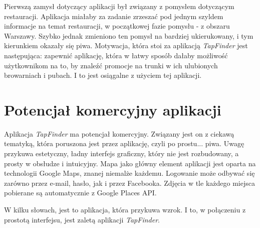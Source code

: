 \documentclass[a4paper]{article}
\begin{document}
Pierwszą zamysł dotyczący aplikacji był związany z pomysłem dotyczącym restauracji. Aplikacja miałaby za zadanie zrzeszać pod jednym szyldem informacje na temat restauracji, w początkowej fazie pomysłu - z obszaru Warszawy. Szybko jednak zmieniono ten pomysł na bardziej ukierukowany, i tym kierunkiem okazały się piwa. Motywacja, która stoi za aplikacją \textit{TapFinder} jest następująca: zapewnić aplikację, która w łatwy sposób dałaby możliwość użytkownikom na to, by znaleźć promocje na trunki w ich ulubionych browarniach i pubach. I to jest osiągalne z użyciem tej aplikacji.

\section{Potencjał komercyjny aplikacji}

Aplikacja \textit{TapFinder} ma potencjał komercyjny. Związany jest on z ciekawą tematyką, która poruszona jest przez aplikację, czyli po prostu... piwa. Uwagę przykuwa estetyczny, ładny interfejs graficzny, który nie jest rozbudowany, a prosty w obsłudze i intuicyjny. Mapa jako główny element aplikacji jest oparta na technologii Google Maps, znanej niemalże każdemu. Logowanie może odbywać się zarówno przez e-mail, hasło, jak i przez Facebooka. Zdjęcia w tle każdego miejsca pobierane są automatycznie z Google Places API.

W kilku słowach, jest to aplikacja, która przykuwa wzrok. I to, w połączeniu z prostotą interfejsu, jest zaletą aplikacji \textit{TapFinder}.
\end{document}
